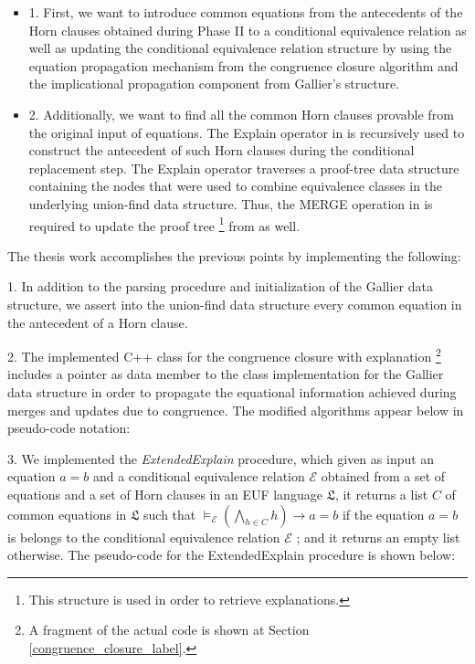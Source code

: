 \begin{itemize}
  \item[] 1. First, we want to introduce 
    common equations from the antecedents of 
    the Horn clauses obtained during Phase II
    to a conditional equivalence relation as well
    as updating the conditional equivalence relation 
    structure by using the equation propagation mechanism
    from the congruence closure algorithm and 
    the implicational propagation component 
    from Gallier's structure.
  \item[] 2. Additionally, we want to find all the common
    Horn clauses provable from the original input 
    of equations. The Explain operator in 
    \cite{10.1007/978-3-540-32033-3_33} is recursively 
    used to construct 
    the antecedent of such Horn clauses during the 
    conditional replacement step. The Explain operator 
    traverses a proof-tree data structure containing the nodes
    that were used to combine equivalence classes 
    in the underlying union-find data structure.
    Thus, the MERGE operation in \cite{GALLIER1987233} is
    required to update the proof tree 
    \footnote{This structure is used in order to retrieve
    explanations.}
    from \cite{10.1007/978-3-540-32033-3_33} as well.
\end{itemize}

The thesis work accomplishes the previous
points by implementing the following:

  1. In addition to the parsing procedure
    and initialization of the Gallier data structure,
    we assert into the union-find data structure 
    every common equation in the 
    antecedent of a Horn clause.

  2. The implemented C++ class for 
    the congruence closure with explanation 
    \footnote{
      A fragment of the actual code is shown
      at Section \ref{congruence_closure_label}.
    } 
    includes a pointer as data member to the 
    class implementation
    for the Gallier data structure in order to propagate 
    the equational information achieved during
    merges and updates due to congruence. The modified 
    algorithms appear below in pseudo-code notation:

    
    
    

  3. We implemented the \emph{ExtendedExplain}
    procedure, which given as input an equation $a = b$ and a
    conditional equivalence relation $\mathcal{E}$ obtained
    from a set of equations and a set of Horn clauses
    in an EUF language $\mathfrak{L}$,
    it returns a list $C$ of common equations in $\mathfrak{L}$
    such that
    $\models_{\mathcal{E}} (\bigwedge_{h \in C} h) \rightarrow a = b$
    if the equation $a = b$ is belongs to the 
    conditional equivalence relation $\mathcal{E}$ ; 
    and it returns an empty list
    otherwise. 
    The pseudo-code
    for the ExtendedExplain procedure is shown 
    below:


